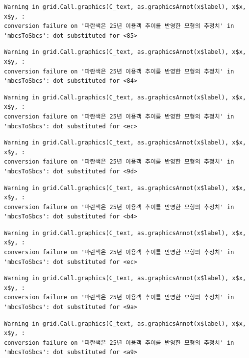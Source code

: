 \documentclass[
  letterpaper,
  DIV=11,
  numbers=noendperiod]{scrreprt}
\begin{document}
\begin{verbatim}
Warning in grid.Call.graphics(C_text, as.graphicsAnnot(x$label), x$x, x$y, :
conversion failure on '파란색은 25년 이용객 추이를 반영한 모형의 추정치' in
'mbcsToSbcs': dot substituted for <85>
\end{verbatim}

\begin{verbatim}
Warning in grid.Call.graphics(C_text, as.graphicsAnnot(x$label), x$x, x$y, :
conversion failure on '파란색은 25년 이용객 추이를 반영한 모형의 추정치' in
'mbcsToSbcs': dot substituted for <84>
\end{verbatim}

\begin{verbatim}
Warning in grid.Call.graphics(C_text, as.graphicsAnnot(x$label), x$x, x$y, :
conversion failure on '파란색은 25년 이용객 추이를 반영한 모형의 추정치' in
'mbcsToSbcs': dot substituted for <ec>
\end{verbatim}

\begin{verbatim}
Warning in grid.Call.graphics(C_text, as.graphicsAnnot(x$label), x$x, x$y, :
conversion failure on '파란색은 25년 이용객 추이를 반영한 모형의 추정치' in
'mbcsToSbcs': dot substituted for <9d>
\end{verbatim}

\begin{verbatim}
Warning in grid.Call.graphics(C_text, as.graphicsAnnot(x$label), x$x, x$y, :
conversion failure on '파란색은 25년 이용객 추이를 반영한 모형의 추정치' in
'mbcsToSbcs': dot substituted for <b4>
\end{verbatim}

\begin{verbatim}
Warning in grid.Call.graphics(C_text, as.graphicsAnnot(x$label), x$x, x$y, :
conversion failure on '파란색은 25년 이용객 추이를 반영한 모형의 추정치' in
'mbcsToSbcs': dot substituted for <ec>
\end{verbatim}

\begin{verbatim}
Warning in grid.Call.graphics(C_text, as.graphicsAnnot(x$label), x$x, x$y, :
conversion failure on '파란색은 25년 이용객 추이를 반영한 모형의 추정치' in
'mbcsToSbcs': dot substituted for <9a>
\end{verbatim}

\begin{verbatim}
Warning in grid.Call.graphics(C_text, as.graphicsAnnot(x$label), x$x, x$y, :
conversion failure on '파란색은 25년 이용객 추이를 반영한 모형의 추정치' in
'mbcsToSbcs': dot substituted for <a9>
\end{verbatim}
\end{document}
